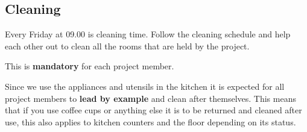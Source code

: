 \subsection*{Cleaning}

    Every Friday at 09.00 is cleaning time. Follow the cleaning schedule and help each other out to clean all the rooms that are held by the project.
     
    This is \textbf{mandatory} for each project member.
     
    Since we use the appliances and utensils in the kitchen it is expected for all project members to \textbf{lead by example} and clean after themselves. This means that if you use coffee cups or anything else it is to be returned and cleaned after use, this also applies to kitchen counters and the floor depending on its status.